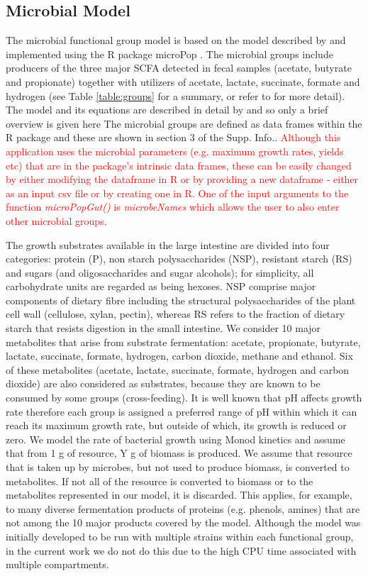 \documentclass[a4paper]{article}
\begin{document}
\subsection*{Microbial Model}
The microbial functional group model is based on the model described by \cite{Kettle2015} and implemented using the R package microPop \citep{Kettle2018}.
The microbial groups include producers of the three major SCFA detected in fecal samples (acetate, butyrate and propionate) together with utilizers of acetate, lactate, succinate, formate and hydrogen (see Table \ref{table:groups} for a summary, or refer to \cite{Kettle2015} for more detail).
The model and its equations are described in detail by \cite{Kettle2015} and \cite{Kettle2018} so only a brief overview is given here
The microbial groups are defined as data frames within the R package and these are shown in section 3 of the Supp. Info..
\textcolor{red}{Although this application uses the microbial parameters (e.g. maximum growth rates, yields etc) that are in the package's intrinsic data frames, these can be easily changed by either modifying the dataframe in R or by providing a new dataframe - either as an input csv file or by creating one in R. One of the input arguments to the function \textit{microPopGut()} is \textit{microbeNames} which allows the user to also enter other microbial groups.    
}

The growth substrates available in the large intestine are divided into four categories: protein (P), non starch polysaccharides (NSP), resistant starch (RS) and sugars (and oligosaccharides and sugar alcohols); for simplicity, all carbohydrate units are regarded as being hexoses. NSP comprise major components of dietary fibre including the structural polysaccharides of the plant cell wall (cellulose, xylan, pectin), whereas RS refers to the fraction of dietary starch that resists digestion in the small intestine.
We consider 10 major metabolites that arise from substrate fermentation: acetate, propionate, butyrate, lactate, succinate, formate, hydrogen, carbon dioxide, methane and ethanol. Six of these metabolites (acetate, lactate, succinate, formate, hydrogen and carbon dioxide) are also considered as substrates, because they are known to be consumed by some groups (cross-feeding). 
It is well known that pH affects growth rate therefore each group is assigned a preferred range of pH within which it can reach its maximum growth rate, but outside of which, its growth is reduced or zero.
We model the rate of bacterial growth using Monod kinetics and assume that from 1 g of resource, Y g of biomass is produced. We assume that resource that is taken up by microbes, but not used to produce biomass, is converted to metabolites. If not all of the resource is converted to biomass or to the metabolites represented in our model, it is discarded. This applies, for example, to many diverse fermentation products of proteins (e.g. phenols, amines) that are not among the 10 major products covered by the model. 
Although the model was initially developed to be run with multiple strains within each functional group, in the current work we do not do this due to the high CPU time associated with multiple compartments.
\end{document}
